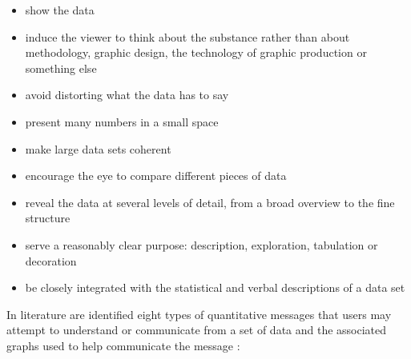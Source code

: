 \documentclass[b5paper,]{book}
\providecommand{\tightlist}{%
  \setlength{\itemsep}{0pt}\setlength{\parskip}{0pt}}
\theoremstyle{definition}
\theoremstyle{definition}
\theoremstyle{definition}
\theoremstyle{remark}
\begin{document}
\begin{itemize}
\tightlist
\item
  show the data
\item
  induce the viewer to think about the substance rather than about
  methodology, graphic design, the technology of graphic production or
  something else
\item
  avoid distorting what the data has to say
\item
  present many numbers in a small space
\item
  make large data sets coherent
\item
  encourage the eye to compare different pieces of data
\item
  reveal the data at several levels of detail, from a broad overview to
  the fine structure
\item
  serve a reasonably clear purpose: description, exploration, tabulation
  or decoration
\item
  be closely integrated with the statistical and verbal descriptions of
  a data set
\end{itemize}

In literature are identified eight types of quantitative messages that
users may attempt to understand or communicate from a set of data and
the associated graphs used to help communicate the message
\citep{few2012show}:
\end{document}

